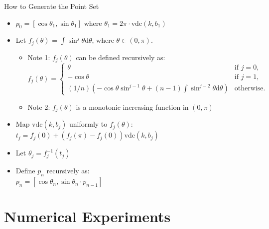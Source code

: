 \documentclass[10pt,ignorenonframetext,serif,onlymath]{beamer}
\begin{document}
\begin{frame}{How to Generate the Point Set}
\protect\hypertarget{how-to-generate-the-point-set}{}

\begin{itemize}
\item
  \(p_0 = [\cos\theta_1, \sin\theta_1]\) where
  \(\theta_1 = 2\pi\cdot\mathrm{vdc}(k,b_1)\)
\item
  Let \(f_j(\theta)\) = \(\int\sin^j\theta \mathrm{d}\theta\), where
  \(\theta\in (0,\pi)\).\\

  \begin{itemize}
  \item
    Note 1: \(f_j(\theta)\) can be defined recursively as:
    \[f_j(\theta) =
    \begin{cases}
    \theta          & \text{if } j = 0 , \\
    -\cos\theta     & \text{if } j = 1 , \\
    (1/n)( -\cos\theta \sin^{j-1}\theta + (n-1)\int\sin^{j-2}\theta \mathrm{d}\theta) & \text{otherwise}.
    \end{cases}\]
  \item
    Note 2: \(f_j(\theta)\) is a monotonic increasing function in
    \((0,\pi)\)
  \end{itemize}
\item
  Map \(\mathrm{vdc}(k,b_j)\) uniformly to \(f_j(\theta)\):\\
  \(t_j = f_j(0) + (f_j(\pi) - f_j(0)) \mathrm{vdc}(k,b_j)\)
\item
  Let \(\theta_j = f_j^{-1}(t_j)\)
\item
  Define \(p_n\) recursively as:\\
  \(p_n = [\cos\theta_n, \sin\theta_n \cdot p_{n-1}]\)
\end{itemize}

\end{frame}

\hypertarget{numerical-experiments}{%
\section{Numerical Experiments}\label{numerical-experiments}}
\end{document}
